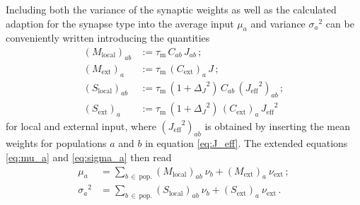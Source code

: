Including both the variance of the synaptic weights as well as the calculated adaption 
for the synapse type into the average input $\mu_a$ and variance ${\sigma_a}^2$ 
can be conveniently written introducing the quantities
\begin{align}
    \label{eq:S_l}
    (M_\text{local})_{ab} 
        &:= \tau_\text{m} \, C_{ab} \,J_{ab} \,;\\ 
    (M_\text{ext})_{a} 
        &:= \tau_\text{m} \, (C_\text{ext})_a \,J \,;\\
    (S_\text{local})_{ab} 
        &:= \tau_\text{m} \,(1 + {\Delta_J}^2) \,C_{ab} \,({J_\text{eff}}^2)_{ab} \,;\\
    (S_\text{ext})_{a} 
        &:= \tau_\text{m} \,(1 + {\Delta_J}^2) \,(C_\text{ext})_a \,{J_\text{eff}}^2 
\end{align}
for local and external input, where $({J_\text{eff}}^2)_{ab}$ is obtained by inserting 
the mean weights for populations $a$ and $b$ in equation \eqref{eq:J_eff}. 
The extended equations \eqref{eq:mu_a} and \eqref{eq:sigma_a} then read
\begin{align}
    \label{eq:mu_a_plus}
    \mu_a        &= 
        \sum_{b \,\in \,\text{pop.}}  (M_\text{local})_{ab} \: \nu_b 
        + (M_\text{ext})_{a} \: \nu_\text{ext} \, ; \\
    \label{eq:sigma_a_plus}
    {\sigma_a}^2 &= 
        \sum_{b \,\in \,\text{pop.}} (S_\text{local})_{ab} \: \nu_b
        + (S_\text{ext})_{a}  \:\nu_\text{ext}\,.
\end{align}




